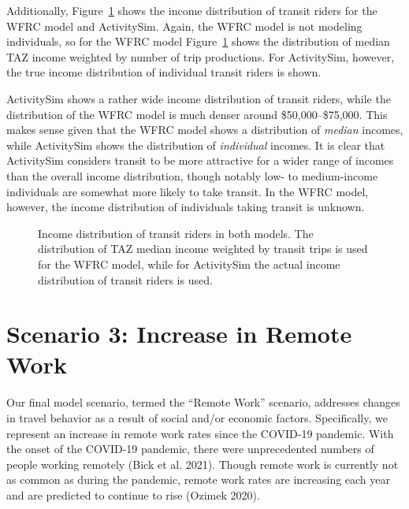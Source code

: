 \documentclass[fancy, oneside, mastersfancy, ms]{byuthesis}
\begin{document}
Additionally, Figure~\ref{fig-tr-se-income-dist} shows the income
distribution of transit riders for the WFRC model and ActivitySim.
Again, the WFRC model is not modeling individuals, so for the WFRC model
Figure~\ref{fig-tr-se-income-dist} shows the distribution of median TAZ
income weighted by number of trip productions. For ActivitySim, however,
the true income distribution of individual transit riders is shown.

ActivitySim shows a rather wide income distribution of transit riders,
while the distribution of the WFRC model is much denser around
\$50,000--\$75,000. This makes sense given that the WFRC model shows a
distribution of \emph{median} incomes, while ActivitySim shows the
distribution of \emph{individual} incomes. It is clear that ActivitySim
considers transit to be more attractive for a wider range of incomes
than the overall income distribution, though notably low- to
medium-income individuals are somewhat more likely to take transit. In
the WFRC model, however, the income distribution of individuals taking
transit is unknown.

\begin{figure}


\caption[Income distribution of transit riders in both
models.]{\label{fig-tr-se-income-dist}Income distribution of transit
riders in both models. The distribution of TAZ median income weighted by
transit trips is used for the WFRC model, while for ActivitySim the
actual income distribution of transit riders is used.}

\end{figure}%


\chapter{Scenario 3: Increase in Remote Work}\label{sec-wfh}

Our final model scenario, termed the ``Remote Work'' scenario, addresses
changes in travel behavior as a result of social and/or economic
factors. Specifically, we represent an increase in remote work rates
since the COVID-19 pandemic. With the onset of the COVID-19 pandemic,
there were unprecedented numbers of people working remotely (Bick et al.
2021). Though remote work is currently not as common as during the
pandemic, remote work rates are increasing each year and are predicted
to continue to rise (Ozimek 2020).
\end{document}
